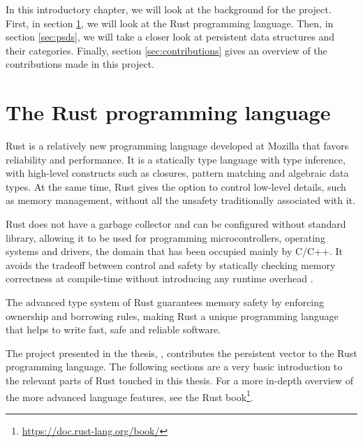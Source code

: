 In this introductory chapter, we will look at the background for the \pvecrs{} project. First, in section \ref{sec:rust}, we will look at the Rust programming language. Then, in section \ref{sec:psds}, we will take a closer look at persistent data structures and their categories. Finally, section \ref{sec:contributions} gives an overview of the contributions made in this project.

\section{The Rust programming language}
\label{sec:rust}

Rust is a relatively new programming language developed at Mozilla that favors reliability and performance. It is a statically type language with type inference, with high-level constructs such as closures, pattern matching and algebraic data types. At the same time, Rust gives the option to control low-level details, such as memory management, without all the unsafety traditionally associated with it.

Rust does not have a garbage collector and can be configured without standard library, allowing it to be used for programming microcontrollers, operating systems and drivers, the domain that has been occupied mainly by C/C++. It avoids the tradeoff between control and safety by statically checking memory correctness at compile-time without introducing any runtime overhead \cite{reed-patina}.

The advanced type system of Rust guarantees memory safety by enforcing ownership and borrowing rules, making Rust a unique programming language that helps to write fast, safe and reliable software.

The project presented in the thesis, \pvecrs{}, contributes the persistent vector to the Rust programming language. The following sections are a very basic introduction to the relevant parts of Rust touched in this thesis. For a more in-depth overview of the more advanced language features, see the Rust book\footnote{\url{https://doc.rust-lang.org/book/}}.

